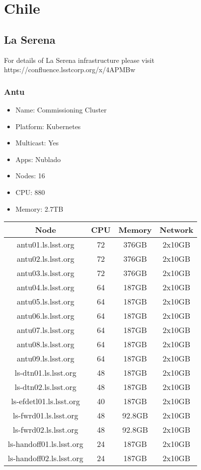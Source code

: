 \section{Chile}
\subsection{La Serena}
For details of La Serena infrastructure please visit https://confluence.lsstcorp.org/x/4APMBw
\subsubsection{Antu}
\begin{itemize}
  \itemsep0em 
  \item Name:      Commissioning Cluster
  \item Platform:  Kubernetes
  \item Multicast: Yes
  \item Apps:      Nublado
  \item Nodes:     16
  \item CPU:       880
  \item Memory:    2.7TB
\end{itemize}
\begin{center}
  \small
  \begin{tabular}{||c c c c||} 
    \hline
    Node & CPU & Memory & Network \\ [0.5ex]
    \hline
    antu01.ls.lsst.org & 72 & 376GB & 2x10GB \\
    \hline
    antu02.ls.lsst.org & 72 & 376GB & 2x10GB \\
    \hline
    antu03.ls.lsst.org & 72 & 376GB & 2x10GB \\
    \hline
    antu04.ls.lsst.org & 64 & 187GB & 2x10GB \\
    \hline
    antu05.ls.lsst.org & 64 & 187GB & 2x10GB \\
    \hline
    antu06.ls.lsst.org & 64 & 187GB & 2x10GB \\
    \hline
    antu07.ls.lsst.org & 64 & 187GB & 2x10GB \\
    \hline
    antu08.ls.lsst.org & 64 & 187GB & 2x10GB \\
    \hline
    antu09.ls.lsst.org & 64 & 187GB & 2x10GB \\
    \hline
    ls-dtn01.ls.lsst.org & 48 & 187GB & 2x10GB \\
    \hline
    ls-dtn02.ls.lsst.org & 48 & 187GB & 2x10GB \\
    \hline
    ls-efdetl01.ls.lsst.org & 40 & 187GB & 2x10GB \\
    \hline
    ls-fwrd01.ls.lsst.org & 48 & 92.8GB & 2x10GB \\
    \hline
    ls-fwrd02.ls.lsst.org & 48 & 92.8GB & 2x10GB \\
    \hline
    ls-handoff01.ls.lsst.org & 24 & 187GB & 2x10GB \\
    \hline
    ls-handoff02.ls.lsst.org & 24 & 187GB & 2x10GB \\
    \hline
  \end{tabular}
\end{center}

